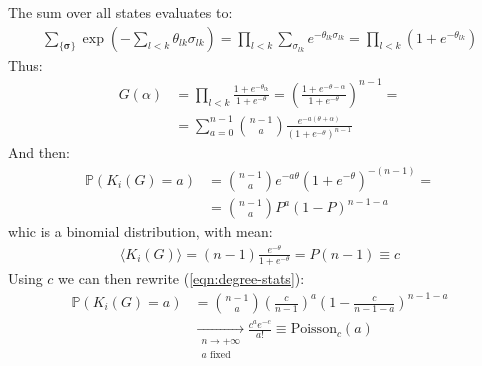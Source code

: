 \documentclass[../../main.tex]{subfiles}
\begin{document}
\begin{exo}
    The sum over all states evaluates to:
    \begin{align*}
        \sum_{\{\bm{\sigma}\}} \exp\left(-\sum_{l < k} \theta_{lk} \sigma_{lk}\right) = \prod_{l < k} \sum_{\sigma_{lk}} e^{-\theta_{lk} \sigma_{lk}} = \prod_{l < k} (1 + e^{-\theta_{lk}})
    \end{align*}
    Thus:
    \begin{align*}
        G(\alpha) &= \prod_{l < k} \frac{1 + e^{-\theta_{lk}}}{1 + e^{-\theta}} = \left(\frac{1 + e^{-\theta - \alpha}}{1 + e^{-\theta}} \right)^{n-1} =\\
        &= \sum_{a=0}^{n-1} {n-1 \choose a} \frac{e^{-a(\theta + \alpha)}}{(1 + e^{-\theta})^{n-1}} 
    \end{align*} %
    And then:
    \begin{align}\label{eqn:degree-stats}
        \mathbb{P}(K_i(G) = a) &= {n-1 \choose a} e^{-a \theta} (1 + e^{-\theta})^{-(n-1)} = \\
        &= {n-1 \choose a} P^a (1-P)^{n-1-a}
    \end{align}
    whic is a binomial distribution, with mean:
    \begin{align*}
        \langle K_i(G) \rangle = (n-1) \frac{e^{-\theta}}{1 + e^{-\theta}}  = P(n-1) \equiv c
    \end{align*}
    Using $c$ we can then rewrite (\ref{eqn:degree-stats}):
    \begin{align*}
        \mathbb{P}(K_i(G) = a) &= {n-1 \choose a} \left(\frac{c}{n-1} \right)^a \left(1 - \frac{c}{n-1 - a} \right)^{n-1-a}\\
        &\xrightarrow[\substack{n \to +\infty\\a \text{ fixed}}]{} \frac{c^a e^{-c}}{a!} \equiv \mathrm{Poisson}_c(a)   
    \end{align*}



\end{exo}
\end{document}
